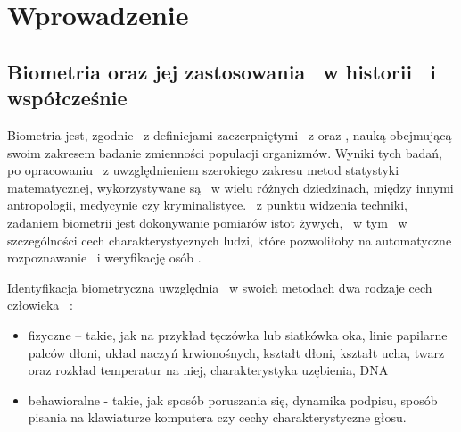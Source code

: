 \chapter{Wprowadzenie}
\label{cha:wprowadzenie}


\section{Biometria oraz jej zastosowania ~w historii ~i współcześnie}
\label{sec:biometria}

Biometria jest, zgodnie ~z definicjami zaczerpniętymi ~z \cite{Ko75} oraz \cite{Bio01}, nauką obejmującą swoim zakresem badanie zmienności populacji organizmów. Wyniki tych badań, po opracowaniu ~z uwzględnieniem szerokiego zakresu metod statystyki matematycznej, wykorzystywane są ~w wielu różnych dziedzinach, między innymi antropologii, medycynie czy kryminalistyce. ~z punktu widzenia techniki, zadaniem biometrii jest dokonywanie pomiarów istot żywych, ~w tym ~w szczególności cech charakterystycznych ludzi, które pozwoliłoby na automatyczne rozpoznawanie ~i weryfikację osób \cite{Bio01}\cite{Jain00}.

Identyfikacja biometryczna uwzględnia ~w swoich metodach dwa rodzaje cech człowieka ~\cite{Bio01}\cite{Bio02}\cite{Jain00}\cite{Jain08}:
\begin{itemize} 
\item fizyczne – takie, jak na przykład tęczówka lub siatkówka oka, linie papilarne palców dłoni, układ naczyń krwionośnych, kształt dłoni, kształt ucha, twarz oraz rozkład temperatur na niej, charakterystyka uzębienia, DNA 
\item behawioralne - takie, jak sposób poruszania się, dynamika podpisu, sposób pisania na klawiaturze komputera czy cechy charakterystyczne głosu.
\end{itemize}

